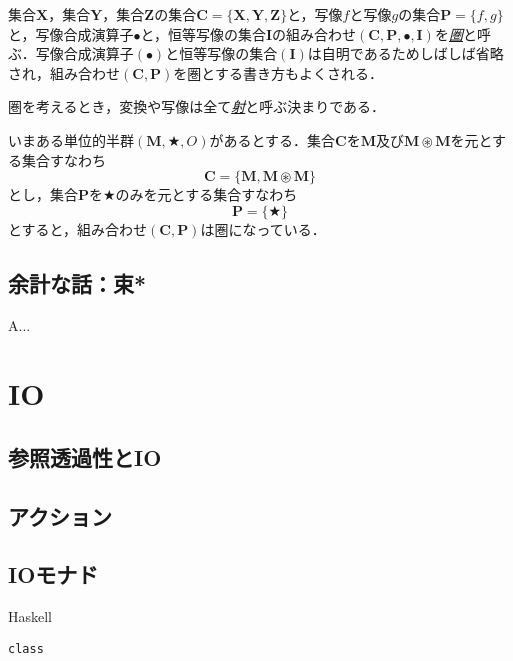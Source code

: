 \documentclass[a5paper,draft]{jsbook}
\newcommand{\programminglanguage}[1]{\textsf{#1}}
\newcommand{\haskell}{\programminglanguage{Haskell}}
\newcommand{\keyword}[1]{{\underline{\emph{#1}}}}
\newenvironment{haskellcode}{\begin{itembox}[r]{\haskell}}{\end{itembox}}
\newcommand{\mathSet}[1]{\mathbf{#1}} %
\newcommand{\mathAnyBinaryOperator}{\mathbin{\bigstar}}
\newcommand{\mathCompose}{\mathbin{\bullet}}
\newcommand{\mathSetTimes}{\mathbin{\circledast}}
\newcommand{\mathCategoryShort}[2]{(#1,#2)}
\newcommand{\mathMonoid}[3]{(#1,#2,#3)}
\newcommand{\mathCategory}[4]{(#1,#2,#3,#4)}
\begin{document}
集合$\mathSet{X}$，集合$\mathSet{Y}$，集合$\mathSet{Z}$の集合$\mathSet{C}=\{\mathSet{X},\mathSet{Y},\mathSet{Z}\}$と，写像$f$と写像$g$の集合$\mathSet{P}=\{f,g\}$と，写像合成演算子$\mathCompose$と，恒等写像の集合$\mathSet{I}$の組み合わせ$\mathCategory{\mathSet{C}}{\mathSet{P}}{\mathCompose}{\mathSet{I}}$を\keyword{圏}と呼ぶ．写像合成演算子$(\mathCompose)$と恒等写像の集合$(\mathSet{I})$は自明であるためしばしば省略され，組み合わせ$\mathCategoryShort{\mathSet{C}}{\mathSet{P}}$を圏とする書き方もよくされる．

圏を考えるとき，変換や写像は全て\keyword{射}と呼ぶ決まりである．

いまある単位的半群$\mathMonoid{\mathSet{M}}{\mathAnyBinaryOperator}{O}$があるとする．集合$\mathSet{C}$を$\mathSet{M}$及び$\mathSet{M}\mathSetTimes\mathSet{M}$を元とする集合すなわち
\begin{equation}
\mathSet{C}=\{\mathSet{M},\mathSet{M}\mathSetTimes\mathSet{M}\}
\end{equation}
とし，集合$\mathSet{P}$を$\mathAnyBinaryOperator$のみを元とする集合すなわち
\begin{equation}
\mathSet{P}=\{\mathAnyBinaryOperator\}
\end{equation}
とすると，組み合わせ$\mathCategoryShort{\mathSet{C}}{\mathSet{P}}$は圏になっている．

\section{余計な話：束*}

A...


\chapter{IO}

\section{参照透過性とIO}

\section{アクション}

\section{IOモナド}

\begin{haskellcode}
\begin{verbatim}
class
\end{verbatim}
\end{haskellcode}
\end{document}
